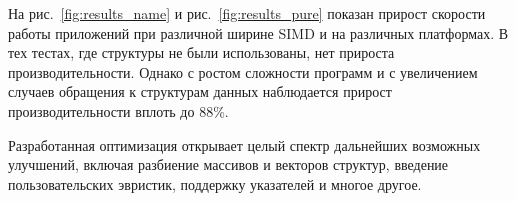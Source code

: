 На рис.~\ref{fig:results_name} и рис.~\ref{fig:results_pure} показан прирост скорости работы приложений при различной ширине SIMD и на различных платформах.
В тех тестах, где структуры не были использованы, нет прироста производительности.
Однако с ростом сложности программ и с увеличением случаев обращения к структурам данных наблюдается прирост производительности вплоть до 88\%.

Разработанная оптимизация открывает целый спектр дальнейших возможных улучшений, включая разбиение массивов и векторов структур, введение пользовательских эвристик, поддержку указателей и многое другое.